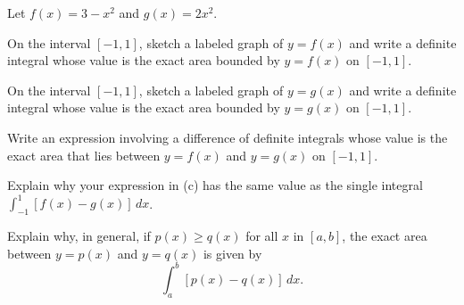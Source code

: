 \begin{exercises}
    \item Let $f(x) = 3 - x^2$ and $g(x) = 2x^2$.
    \ba
    	\item On the interval $[-1,1]$, sketch a labeled graph of $y = f(x)$ and write a definite integral whose value is the exact area bounded by $y = f(x)$ on $[-1,1]$.
	\item On the interval $[-1,1]$, sketch a labeled graph of $y = g(x)$ and write a definite integral whose value is the exact area bounded by $y = g(x)$ on $[-1,1]$.
	\item Write an expression involving a difference of definite integrals whose value is the exact area that lies between $y = f(x)$ and $y = g(x)$ on $[-1,1]$.
	\item Explain why your expression in (c) has the same value as the single integral \\ $\int_{-1}^1 [f(x) - g(x)] \, dx$.
	\item Explain why, in general, if $p(x) \ge q(x)$ for all $x$ in $[a,b]$, the exact area between $y = p(x)$ and $y = q(x)$ is given by
	$$\int_a^b [p(x) - q(x)] \, dx.$$
    \ea
\end{exercises}
\afterexercises
